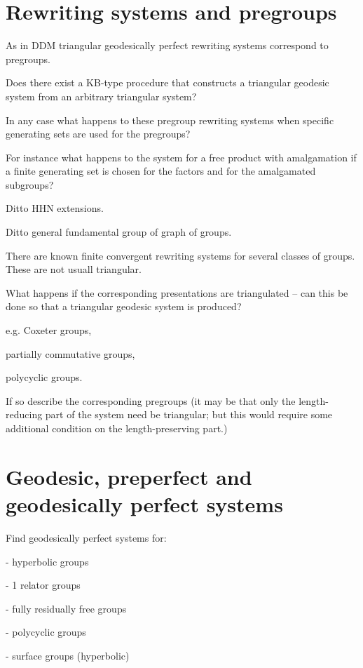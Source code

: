 \documentclass[a4paper]{article}
\begin{document}
\section{Rewriting systems and pregroups}

As in DDM triangular geodesically perfect rewriting systems correspond to pregroups.



Does there exist a KB-type procedure that constructs a triangular geodesic system from an arbitrary triangular system?



In any case what happens to these pregroup rewriting systems when specific generating sets are used for the pregroups?

For instance what happens to the system for a free product with amalgamation if a finite generating set is chosen for the factors and for the amalgamated subgroups?

Ditto HHN extensions.

Ditto general fundamental group of graph of groups.



There are known finite convergent rewriting systems for several classes of groups. These are not usuall triangular.

What happens if the corresponding presentations are triangulated  --  can this be done so that a triangular geodesic system is produced?

e.g. Coxeter groups,

partially commutative groups,

polycyclic groups.

If so describe the corresponding pregroups (it may be that only the length-reducing part of the system need be triangular; but this would require some additional condition on the length-preserving part.)



\section{Geodesic, preperfect and geodesically perfect systems}

Find geodesically perfect systems for:

- hyperbolic groups

- 1 relator groups

- fully residually free groups

- polycyclic groups

- surface groups (hyperbolic)
\end{document}

